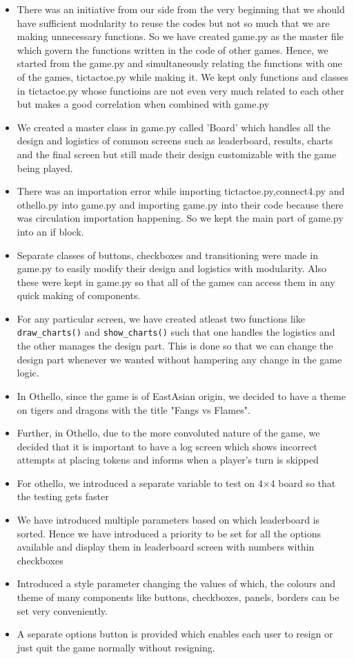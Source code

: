 \documentclass[12pt, a4paper]{article}
\begin{document}
\begin{itemize}
    \item{There was an initiative from our side from the very beginning that we should have sufficient modularity to reuse the codes but not so much that we are making unnecessary functions. So we have created game.py as the master file which govern the functions written in the code of other games. Hence, we started from the game.py and simultaneously relating the functions with one of the games, tictactoe.py while making it. We kept only functions and classes in tictactoe.py whose functioins are not even very much related to each other but makes a good correlation when combined with game.py}
    \item{We created a master class in game.py called 'Board' which handles all the design and logistics of common screens such as leaderboard, results, charts and the final screen but still made their design customizable with the game being played.}
    \item{There was an importation error while importing tictactoe.py,connect4.py and othello.py into game.py and importing game.py into their code because there was circulation importation happening. So we kept the main part of game.py into an if block.}
    \item{Separate classes of buttons, checkboxes and transitioning were made in game.py to easily modify their design and logistics with modularity. Also these were kept in game.py so that all of the games can access them in any quick making of components.}
    \item{For any particular screen, we have created atleast two functions like \texttt{draw\_charts()} and \texttt{show\_charts()} such that one handles the logistics and the other manages the design part. This is done so that we can change the design part whenever we wanted without hampering any change in the game logic.}
    \item{In Othello, since the game is of East\texttt{\-}Asian origin, we decided to have a theme on tigers and dragons with the title "Fangs vs Flames".}
    \item{Further, in Othello, due to the more convoluted nature of the game, we decided that it is important to have a log screen which shows incorrect attempts at placing tokens and informs when a player's turn is skipped}
    \item{For othello, we introduced a separate variable to test on 4×4 board so that the testing gets faster}
    \item{We have introduced multiple parameters based on which leaderboard is sorted. Hence we have introduced a priority to be set for all the options available and display them in leaderboard screen with numbers within checkboxes}
    \item{Introduced a style parameter changing the values of which, the colours and theme of many components like buttons, checkboxes, panels, borders can be set very conveniently.}
    \item{A separate options button is provided which enables each user to resign or just quit the game normally without resigning.}
\end{itemize}
\end{document}
